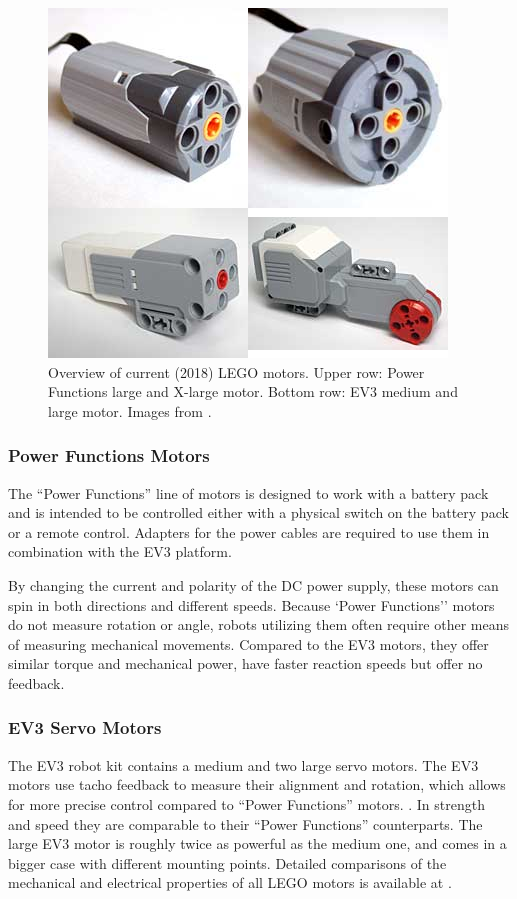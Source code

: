 \documentclass[11pt, a4paper]{article}
\begin{document}
\begin{figure}
\centering
\includegraphics[width=0.4\linewidth]{images/motors}
\caption{Overview of current (2018) LEGO motors. Upper row: Power Functions large and X-large motor. Bottom row: EV3 medium and large motor. Images from \cite{motor_comparison}.}
\label{fig:motors}
\end{figure}


\subsubsection*{Power Functions Motors}
The ``Power Functions'' line of motors is designed to work with a battery pack and is intended to be controlled either with a physical switch on the battery pack or a remote control. Adapters for the power cables are required to use them in combination with the EV3 platform. \cite{power_fun}

By changing the current and polarity of the DC power supply, these motors can spin in both directions and different speeds. Because `Power Functions'' motors do not measure rotation or angle, robots utilizing them often require other means of measuring mechanical movements. Compared to the EV3 motors, they offer similar torque and mechanical power, have faster reaction speeds but offer no feedback. \cite{motor_comparison}


\subsubsection*{EV3 Servo Motors}
The EV3 robot kit contains a medium and two large servo motors. The EV3 motors use tacho feedback to measure their alignment and rotation, which allows for more precise control compared to ``Power Functions'' motors. \cite{Servo_Motor}. In strength and speed they are comparable to their ``Power Functions'' counterparts. The large EV3 motor is roughly twice as powerful as the medium one, and comes in a bigger case with different mounting points. Detailed comparisons of the mechanical and electrical properties of all LEGO motors is available at \cite{motor_comparison}.
\end{document}
